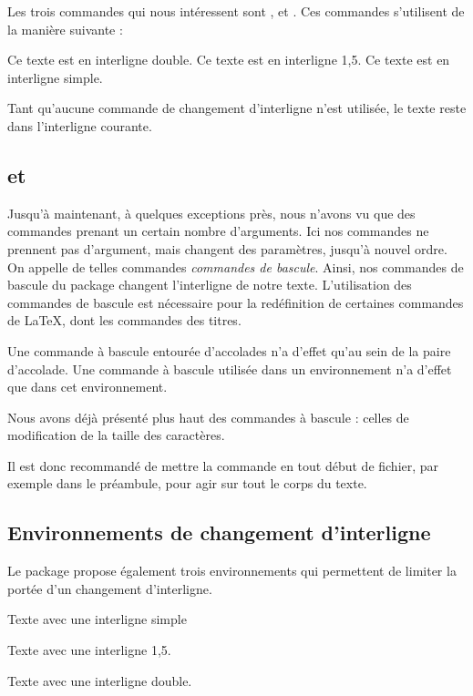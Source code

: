 Les trois commandes qui nous intéressent sont ,  et . Ces commandes s'utilisent de la manière suivante :

\begin{latexcode}
\doublespacing
Ce texte est en interligne double.
\onehalfspacing
Ce texte est en interligne 1,5.
\singlespacing
Ce texte est en interligne simple. 
\end{latexcode}

Tant qu'aucune commande de changement d'interligne n'est utilisée, le texte reste dans l'interligne courante. 

\subsection{ et }\label{bascule}

Jusqu'à maintenant, à quelques exceptions près, nous n'avons vu que des commandes prenant un certain nombre d'arguments. Ici nos commandes ne prennent pas d'argument, mais changent des paramètres, jusqu'à nouvel ordre. On appelle de telles commandes \emph{commandes de bascule}. Ainsi, nos commandes de bascule du package  changent l'interligne de notre texte. L'utilisation des commandes de bascule est nécessaire pour la redéfinition de certaines commandes de \LaTeX, dont les commandes des titres.

Une commande à bascule entourée d'accolades n'a d'effet qu'au sein de la paire d'accolade. Une commande à bascule utilisée dans un environnement n'a d'effet que dans cet environnement.\label{porteebascule} 

Nous avons déjà présenté plus haut des commandes à bascule : celles de modification de la taille des caractères.

Il est donc recommandé de mettre la commande  en tout début de fichier, par exemple dans le préambule, pour agir sur tout le corps du texte.

\subsection{Environnements de changement d'interligne}

Le package  propose également trois environnements qui permettent de limiter la portée d'un changement d'interligne. 

\begin{latexcode}
\begin{singlespace}
Texte avec une interligne simple
\end{singlespace}
\begin{onehalfspace}
Texte avec une interligne 1,5.
\end{onehalfspace}
\begin{doublespace}
Texte avec une interligne double.
\end{doublespace}
\end{latexcode}

